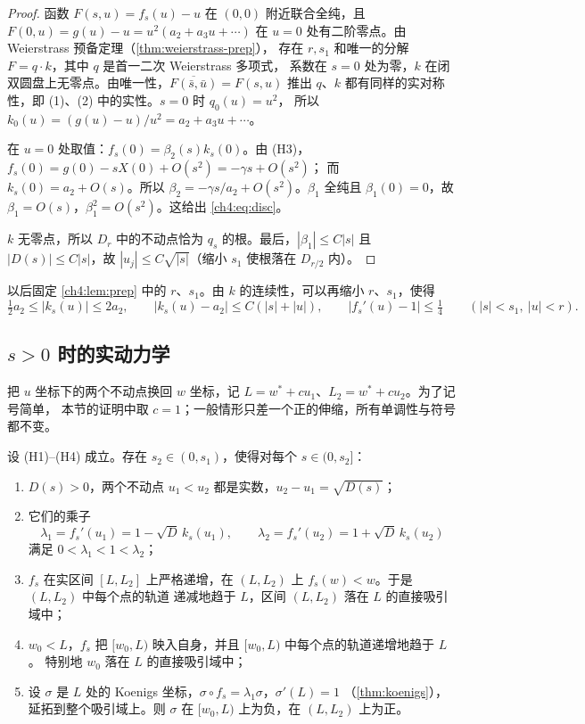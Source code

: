 \begin{proof}
函数 $F(s,u)=f_s(u)-u$ 在 $(0,0)$ 附近联合全纯，且 $F(0,u)=g(u)-u=u^2(a_2+a_3u+\cdots)$
在 $u=0$ 处有二阶零点。由 Weierstrass 预备定理（\cref{thm:weierstrass-prep}），
存在 $r,s_1$ 和唯一的分解 $F=q\cdot k$，其中 $q$ 是首一二次 Weierstrass 多项式，
系数在 $s=0$ 处为零，$k$ 在闭双圆盘上无零点。由唯一性，$\overline{F(\bar s,\bar u)}=F(s,u)$
推出 $q$、$k$ 都有同样的实对称性，即 (1)、(2) 中的实性。$s=0$ 时 $q_0(u)=u^2$，
所以 $k_0(u)=(g(u)-u)/u^2=a_2+a_3u+\cdots$。

在 $u=0$ 处取值：$f_s(0)=\beta_2(s)k_s(0)$。由 (H3)，$f_s(0)=g(0)-sX(0)+O(s^2)=-\gamma s+O(s^2)$；
而 $k_s(0)=a_2+O(s)$。所以 $\beta_2=-\gamma s/a_2+O(s^2)$。$\beta_1$ 全纯且 $\beta_1(0)=0$，故
$\beta_1=O(s)$，$\beta_1^2=O(s^2)$。这给出 \eqref{ch4:eq:disc}。

$k$ 无零点，所以 $D_r$ 中的不动点恰为 $q_s$ 的根。最后，$|\beta_1|\le C|s|$ 且
$|D(s)|\le C|s|$，故 $|u_j|\le C\sqrt{|s|}$（缩小 $s_1$ 使根落在 $D_{r/2}$ 内）。
\end{proof}

以后固定 \cref{ch4:lem:prep} 中的 $r$、$s_1$。由 $k$ 的连续性，可以再缩小 $r$、$s_1$，使得
\begin{equation}\label{ch4:eq:k-bounds}
 \tfrac12a_2\le|k_s(u)|\le2a_2,\qquad |k_s(u)-a_2|\le C(|s|+|u|),\qquad
 |f_s'(u)-1|\le\tfrac14
 \qquad(|s|<s_1,\ |u|<r).
\end{equation}

\subsection{$s>0$ 时的实动力学}

把 $u$ 坐标下的两个不动点换回 $w$ 坐标，记 $L=w^*+cu_1$、$L_2=w^*+cu_2$。为了记号简单，
本节的证明中取 $c=1$；一般情形只差一个正的伸缩，所有单调性与符号都不变。

\begin{lemma}[实动力学]\label{ch4:lem:real-dynamics}
设 (H1)--(H4) 成立。存在 $s_2\in(0,s_1)$，使得对每个 $s\in(0,s_2]$：
\begin{enumerate}
\item $D(s)>0$，两个不动点 $u_1<u_2$ 都是实数，$u_2-u_1=\sqrt{D(s)}$；
\item 它们的乘子
  \begin{equation}\label{ch4:eq:multipliers}
   \lambda_1=f_s'(u_1)=1-\sqrt{D}\,k_s(u_1),\qquad \lambda_2=f_s'(u_2)=1+\sqrt{D}\,k_s(u_2)
  \end{equation}
  满足 $0<\lambda_1<1<\lambda_2$；
\item $f_s$ 在实区间 $[L,L_2]$ 上严格递增，在 $(L,L_2)$ 上 $f_s(w)<w$。于是 $(L,L_2)$ 中每个点的轨道
  递减地趋于 $L$，区间 $(L,L_2)$ 落在 $L$ 的直接吸引域中；
\item $w_0<L$，$f_s$ 把 $[w_0,L)$ 映入自身，并且 $[w_0,L)$ 中每个点的轨道递增地趋于 $L$。
  特别地 $w_0$ 落在 $L$ 的直接吸引域中；
\item 设 $\sigma$ 是 $L$ 处的 Koenigs 坐标，$\sigma\circ f_s=\lambda_1\sigma$，$\sigma'(L)=1$
  （\cref{thm:koenigs}），延拓到整个吸引域上。则 $\sigma$ 在 $[w_0,L)$ 上为负，在 $(L,L_2)$ 上为正。
\end{enumerate}
\end{lemma}

